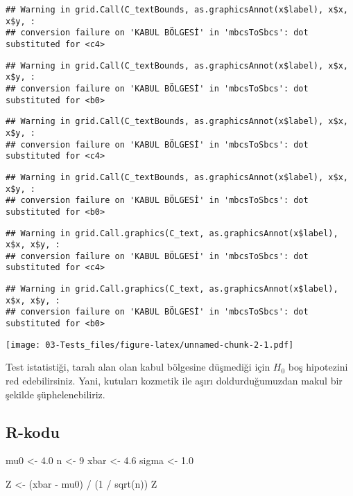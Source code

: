 \documentclass[
  12pt,
]{book}
\newenvironment{Shaded}{\begin{snugshade}}{\end{snugshade}}
\newcommand{\DecValTok}[1]{\textcolor[rgb]{0.00,0.00,0.81}{#1}}
\newcommand{\FloatTok}[1]{\textcolor[rgb]{0.00,0.00,0.81}{#1}}
\newcommand{\FunctionTok}[1]{\textcolor[rgb]{0.00,0.00,0.00}{#1}}
\newcommand{\NormalTok}[1]{#1}
\newcommand{\OtherTok}[1]{\textcolor[rgb]{0.56,0.35,0.01}{#1}}
\newcommand{\SpecialCharTok}[1]{\textcolor[rgb]{0.00,0.00,0.00}{#1}}
\begin{document}
\begin{verbatim}
## Warning in grid.Call(C_textBounds, as.graphicsAnnot(x$label), x$x, x$y, :
## conversion failure on 'KABUL BÖLGESİ' in 'mbcsToSbcs': dot substituted for <c4>
\end{verbatim}

\begin{verbatim}
## Warning in grid.Call(C_textBounds, as.graphicsAnnot(x$label), x$x, x$y, :
## conversion failure on 'KABUL BÖLGESİ' in 'mbcsToSbcs': dot substituted for <b0>
\end{verbatim}

\begin{verbatim}
## Warning in grid.Call(C_textBounds, as.graphicsAnnot(x$label), x$x, x$y, :
## conversion failure on 'KABUL BÖLGESİ' in 'mbcsToSbcs': dot substituted for <c4>
\end{verbatim}

\begin{verbatim}
## Warning in grid.Call(C_textBounds, as.graphicsAnnot(x$label), x$x, x$y, :
## conversion failure on 'KABUL BÖLGESİ' in 'mbcsToSbcs': dot substituted for <b0>
\end{verbatim}

\begin{verbatim}
## Warning in grid.Call.graphics(C_text, as.graphicsAnnot(x$label), x$x, x$y, :
## conversion failure on 'KABUL BÖLGESİ' in 'mbcsToSbcs': dot substituted for <c4>
\end{verbatim}

\begin{verbatim}
## Warning in grid.Call.graphics(C_text, as.graphicsAnnot(x$label), x$x, x$y, :
## conversion failure on 'KABUL BÖLGESİ' in 'mbcsToSbcs': dot substituted for <b0>
\end{verbatim}

\texttt{[image: 03-Tests\_files/figure-latex/unnamed-chunk-2-1.pdf]}

Test istatistiği, taralı alan olan kabul bölgesine düşmediği için \(H_{0}\) boş hipotezini red edebilirsiniz. Yani, kutuları kozmetik ile aşırı doldurduğumuzdan makul bir şekilde şüphelenebiliriz.

\hypertarget{r-kodu}{%
\subsection{R-kodu}\label{r-kodu}}

\begin{Shaded}
\begin{Highlighting}[]
\NormalTok{mu0 }\OtherTok{\textless{}{-}} \FloatTok{4.0}
\NormalTok{n }\OtherTok{\textless{}{-}} \DecValTok{9}
\NormalTok{xbar }\OtherTok{\textless{}{-}} \FloatTok{4.6}
\NormalTok{sigma }\OtherTok{\textless{}{-}} \FloatTok{1.0}

\NormalTok{Z }\OtherTok{\textless{}{-}}\NormalTok{ (xbar }\SpecialCharTok{{-}}\NormalTok{ mu0) }\SpecialCharTok{/}\NormalTok{ (}\DecValTok{1} \SpecialCharTok{/} \FunctionTok{sqrt}\NormalTok{(n))}
\NormalTok{Z}
\end{Highlighting}
\end{Shaded}
\end{document}

